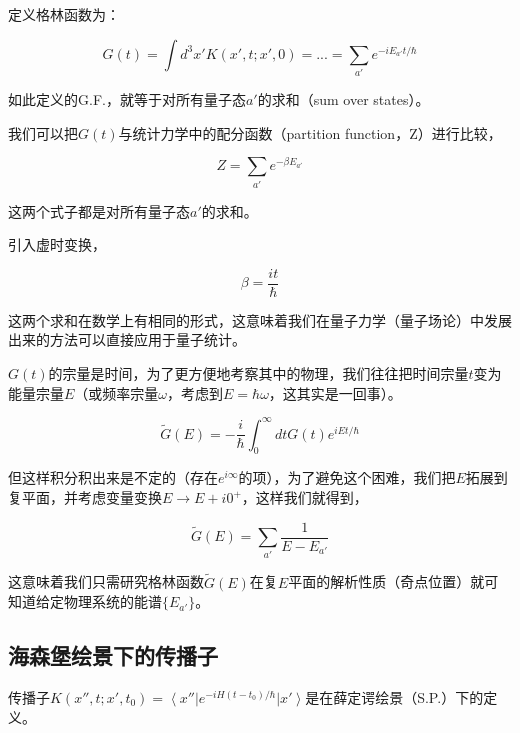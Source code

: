 定义格林函数为：

\begin{equation}
G(t) = \int d^3 x' K(x', t; x', 0) = ... = \sum\limits_{a'} e^{-i E_{a'} t / \hbar}
\end{equation}

如此定义的G.F.，就等于对所有量子态$a'$的求和（sum over states）。

我们可以把$G(t)$与统计力学中的配分函数（partition function，Z）进行比较，

\begin{equation}
Z = \sum\limits_{a'} e^{- \beta E_{a'}}
\end{equation}

这两个式子都是对所有量子态$a'$的求和。

引入虚时变换，

\begin{equation}
\beta = \frac{i t }{\hbar }
\end{equation}

这两个求和在数学上有相同的形式，这意味着我们在量子力学（量子场论）中发展出来的方法可以直接应用于量子统计。

$G(t)$的宗量是时间，为了更方便地考察其中的物理，我们往往把时间宗量$t$变为能量宗量$E$（或频率宗量$\omega$，考虑到$E = \hbar \omega$，这其实是一回事）。

\begin{equation}
\widetilde{G} (E) = - \frac{i}{\hbar } \int_0^{\infty} dt G(t ) e^{i Et / \hbar}
\end{equation}

但这样积分积出来是不定的（存在$e^{i \infty}$的项），为了避免这个困难，我们把$E$拓展到复平面，并考虑变量变换$E \to E + i 0^+$，这样我们就得到，

\begin{equation}
\widetilde{G} (E) = \sum\limits_{a'} \frac{1}{ E - E_{a'}}
\end{equation}

这意味着我们只需研究格林函数$\widetilde{G} (E)$在复$E$平面的解析性质（奇点位置）就可知道给定物理系统的能谱$\{ E_{a'} \}$。

\subsection{海森堡绘景下的传播子}

传播子$K (x'',t; x',t_0) = \left\langle x'' \right| e^{- i H (t - t_0) / \hbar} \left| x' \right\rangle$是在薛定谔绘景（S.P.）下的定义。

